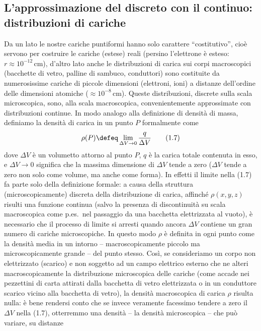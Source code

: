 \subsection{L'approssimazione del discreto con il continuo: distribuzioni di
cariche}

Da un lato le nostre cariche puntiformi hanno solo carattere ``costitutivo'',
cio\`e servono per costruire le cariche (estese) reali (persino l'elettrone \`e
esteso: $r\approx10^{-12}\,\mathrm{cm}$), d'altro lato anche le distribuzioni di
carica sui corpi macroscopici (bacchette di vetro, palline di sambuco,
conduttori) sono costituite da numerosissime cariche di piccole dimensioni
(elettroni, ioni) a distanze dell'ordine delle dimensioni atomiche
($\approx10^{-8}\,\mathrm{cm}$). Queste distribuzioni, discrete sulla scala
microscopica, sono, alla scala macroscopica, convenientemente approssimate con
distribuzioni continue. In modo analogo alla definizione di densit\`a di massa,
definiamo la densit\`a di carica in un punto $P$ formalmente come
\begin{equation}
  \rho(P)\defeq\lim_{\Delta V\to0}\frac{q}{\Delta V}
  \tag{1.7}
\end{equation}
dove $\Delta V$ \`e un volumetto attorno al punto $P$, $q$ \`e la carica totale
contenuta in esso, e $\Delta V\to0$ significa che la massima dimensione di
$\Delta V$ tende a zero ($\Delta V$ tende a zero non solo come volume, ma anche
come forma). In effetti il limite nella (1.7) fa parte solo della definizione
formale: a causa della struttura (microscopicamente) discreta della
distribuzione di carica, affinch\'e $\rho(x,y,z)$ risulti una funzione continua
(salvo la presenza di discontinuit\`a su scala macroscopica come p.es.\ nel
passaggio da una bacchetta elettrizzata al vuoto), \`e necessario che il
processo di limite si arresti quando ancora $\Delta V$ contiene un gran numero
di cariche microscopiche. In questo modo $\rho$ \`e definita in ogni punto come
la densit\`a media in un intorno -- macroscopicamente piccolo ma
microscopicamente grande -- del punto stesso. Cos\`i, se consideriamo un corpo
non elettrizzato (scarico) e non soggetto ad un campo elettrico esterno che ne
alteri macroscopicamente la distribuzione microscopica delle cariche (come
accade nei pezzettini di carta attirati dalla bacchetta di vetro elettrizzata o
in un conduttore scarico vicino alla bacchetta di vetro), la densit\`a
macroscopica di carica $\rho$ risulta nulla: \`e bene rendersi conto che se
invece veramente facessimo tendere a zero il $\Delta V$ nella (1.7), otterremmo
una densit\`a -- la densit\`a microscopica -- che pu\`o variare, su distanze

